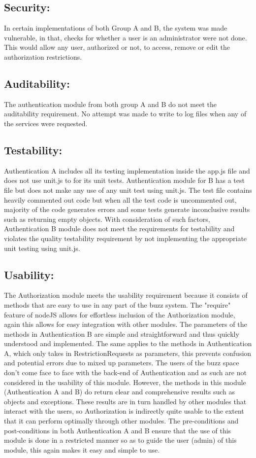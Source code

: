 \subsection{Security:}
In certain implementations of both  Group A and B, the system was made vulnerable, in that, checks for whether a user is an administrator were not done. This would allow any user, authorized or not, to access, remove or edit the authorization restrictions.

\subsection{Auditability:}
The authentication module from both group A and B do not meet the auditability requirement. No attempt was made to write to log files when any of the services were requested.

\subsection{Testability:}
Authentication A includes all its testing implementation inside the app.js file and does not use unit.js to for its unit tests.  
Authentication module for B has a test file but does not make any use of any unit test using unit.js. The test file contains heavily commented out code but when all the test code is uncommented out, majority of the code generates errors and some tests generate inconclusive results such as returning empty objects. With consideration of such factors, Authentication B module does not meet the requirements for testability and violates the quality testability requirement by not implementing the appropriate unit testing using unit.js.

\subsection{Usability:}
The Authorization module meets the usability requirement because it consists
of methods that are easy to use in any part of the buzz system.
The "require" feature of nodeJS allows for effortless inclusion of the Authorization 
module, again this allows for easy integration with other modules.
The parameters of the methods in Authentication B are simple and straightforward and thus
quickly understood and implemented. The same applies to the methods in Authentication A, 
which only takes in RestrictionRequests as parameters, this prevents confusion and potential
errors due to mixed up parameters. 
The users of the buzz space don't come face to face with the back-end of Authentication and as 
such are not considered in the usability of this module. However, the methods in this module
(Authentication A and B) do return clear and comprehensive results such as objects and exceptions. 
These results are in turn handled by other modules that interact with the users, so Authorization 
is indirectly quite usable to the extent that it can perform optimally through other modules.
The pre-conditions and post-conditions in both Authentication A and B ensure that the use of this 
module is done in a restricted manner so as to guide the user (admin) of this module, this again
makes it easy and simple to use.

